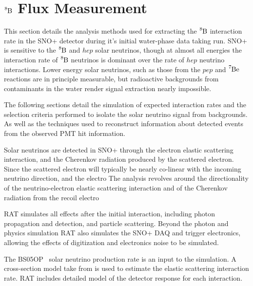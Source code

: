 \chapter{$\ce{^{8}B}$ Flux Measurement}
\label{sec:sigex}

\ifpdf
    \graphicspath{{sigex/figures/PNG/}{sigex/figures/PDF/}{sigex/figures/}}
\else
    \graphicspath{{sigex/figures/EPS/}{sigex/figures/}}
\fi


This section details the analysis methods used for extracting the $\ce{^{8}B}$
interaction rate in the SNO+ detector during it's initial water-phase
data taking run.
SNO+ is sensitive to the $\ce{^{8}B}$ and $hep$ solar neutrinos,
though at almost all energies the interaction rate of $\ce{^{8}B}$ neutrinos
is dominant over the rate of $hep$ neutrino interactions.
Lower energy solar neutrinos, such as those from the $pep$ and $\ce{^{7}Be}$
reactions are in principle measurable, but radioactive backgrounds from
contaminants in the water render signal extraction nearly impossible.

The following sections detail the simulation of expected interaction rates
and the selection criteria performed to isolate the solar neutrino signal
from backgrounds.
As well as the techniques used to reconstruct information about detected events
from the observed PMT hit information.

Solar neutrinos are detected in SNO+ through the electron elastic scattering
interaction, and the Cherenkov radiation produced by the scattered
electron.
Since the scattered electron will typically be nearly co-linear with
the incoming neutrino direction, and the electro
The analysis revolves around the directionality of the neutrino-electron
elastic scattering interaction and of the Cherenkov radiation from
the recoil electro

RAT simulates all effects after the initial interaction, including photon
propagation and detection, and particle scattering.
Beyond the photon and physics simulation RAT also simulates the SNO+ DAQ and trigger electronics,
allowing the effects of digitization and electronics noise to be simulated.

The BS05OP~\cite{bs_ssm} solar neutrino production rate is an input to the simulation.
A cross-section model take from \citep{esxsec}
is used to estimate the elastic scattering interaction rate.
RAT includes detailed model of the detector response for each interaction.

